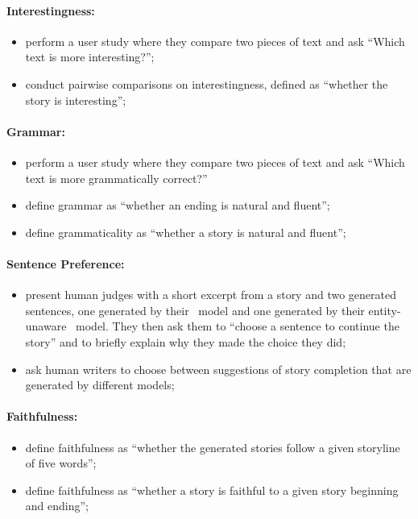 \paragraph{Interestingness:}
\begin{itemize}[nolistsep]
    \item \citet{khalifa2017deeptingle} perform a user study where they compare two pieces of text and ask ``Which text is more interesting?'';
    \item \citet{yao2019plan} conduct pairwise comparisons on interestingness, defined as ``whether the story is interesting'';
\end{itemize}

\paragraph{Grammar:}
\begin{itemize}[nolistsep]
    \item \citet{khalifa2017deeptingle} perform a user study where they compare two pieces of text and ask ``Which text is more grammatically correct?''
    \item \citet{guan2019story} define grammar as ``whether an ending is natural and fluent'';
    \item \citet{guan-etal-2020-knowledge} define grammaticality as ``whether a story is natural and fluent'';
\end{itemize}

\paragraph{Sentence Preference:}
\begin{itemize}[nolistsep]
    \item \citet{clark-etal-2018-neural} present human judges with a short excerpt from a story and two generated sentences, one generated by their \engen\ model and one generated by their entity-unaware \stsa\ model. They then ask them to ``choose a sentence to continue the story'' and to briefly explain why they made the choice they did;
    \item \citet{clark-smith-2021-choose} ask human writers to choose between suggestions of story completion that are generated by different models;
\end{itemize}

\paragraph{Faithfulness:}
\begin{itemize}[nolistsep]
    \item \citet{peng-etal-2018-towards} define faithfulness as ``whether the generated stories follow a given storyline of five words'';
    \item \citet{wang2020narrative} define faithfulness as ``whether a story is faithful to a given story beginning and ending'';
\end{itemize}


